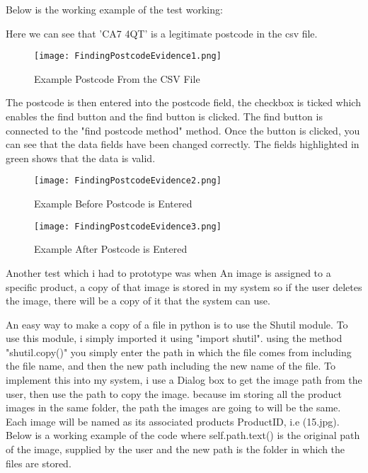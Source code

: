  Below is the working example of the test working:

\pagebreak


Here we can see that 'CA7 4QT' is a legitimate postcode in the csv file.

\begin{figure}[H]
\caption{Example Postcode From the CSV File} \label{fig:Example Address From CSV File}
\hfill\texttt{[image: FindingPostcodeEvidence1.png]}\hspace*{\fill}
\end{figure}

The postcode is then entered into the postcode field, the checkbox is ticked which enables the find button and the find button is clicked. The find button is connected to the "find postcode method" method. Once the button is clicked, you can see that the data fields have been changed correctly. The fields highlighted in green shows that the data is valid.

\begin{figure}[H]
\caption{Example Before Postcode is Entered} \label{fig:Example Before Postcode is entered}
\hfill\texttt{[image: FindingPostcodeEvidence2.png]}\hspace*{\fill}
\end{figure}

\begin{figure}[H]
\caption{Example After Postcode is Entered} \label{fig:Example After matching Postcode is entered}
\hfill\texttt{[image: FindingPostcodeEvidence3.png]}\hspace*{\fill}
\end{figure}

Another test which i had to prototype was when An image is assigned to a specific product, a copy of that image is stored in my system so if the user deletes the image, there will be a copy of it that the system can use. 

An easy way to make a copy of a file in python is to use the Shutil module. To use this module, i simply imported it using "import shutil". using the method "shutil.copy()" you simply enter the path in which the file comes from including the file name, and then the new path including the new name of the file. To implement this into my system, i use a Dialog box to get the image path from the user, then use the path to copy the image. because im storing all the product images in the same folder, the path the images are going to will be the same. Each image will be named as its associated products ProductID, i.e (15.jpg). Below is a working example of the code where self.path.text() is the original path of the image, supplied by the user and the new path is the folder in which the files are stored.


